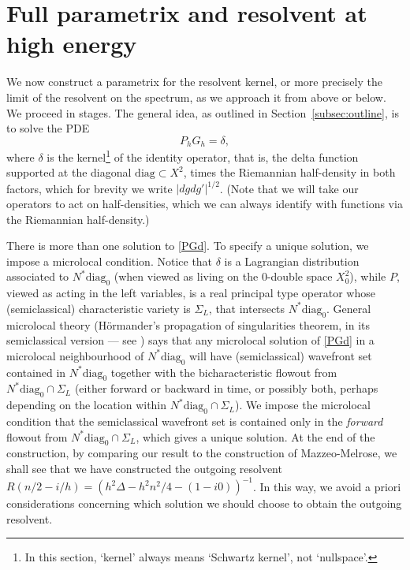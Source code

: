 \documentclass[10pt, a4paper, twoside]{amsart}
\numberwithin{equation}{section}
\theoremstyle{remark}
\begin{document}
\section{Full parametrix and resolvent at high energy}\label{sec:parametrix}
We now construct a parametrix for the resolvent kernel, or more precisely the limit of the resolvent on the spectrum, as we approach it from above or below. We proceed in stages. The general idea, as outlined in Section~\ref{subsec:outline}, is to solve the PDE
\begin{equation}
P_h G_h = \delta,
\label{PGd}\end{equation}
where $\delta$ is the kernel\footnote{In this section, `kernel' always means `Schwartz kernel', not `nullspace'.} of the identity operator, that is, the delta function supported at the diagonal ${\mathrm{diag}} \subset X^2$, times the Riemannian half-density in both factors, which for brevity we write  $|dg dg'|^{1/2}$. (Note that we will take our operators to act on half-densities, which we can always identify with functions via the Riemannian half-density.) 

There is more than one solution to \eqref{PGd}. To specify a unique solution, we impose a microlocal condition. Notice that $\delta$ is a Lagrangian distribution associated to $N^* {\mathrm{diag}_0}$ (when viewed as living on the $0$-double space $X^2_0$), while $P$, viewed as acting in the left variables, is a real principal type operator whose (semiclassical) characteristic variety is $\Sigma_L$, that intersects 
$N^* {\mathrm{diag}_0}$. General microlocal theory (H\"ormander's propagation of singularities theorem, in its semiclassical version --- see \cite[Section 12.3]{zworski})  says that any microlocal solution of \eqref{PGd} in a microlocal neighbourhood of $N^* {\mathrm{diag}_0}$ will have (semiclassical) wavefront set contained in $N^* {\mathrm{diag}_0}$ together with the bicharacteristic flowout from $N^* {\mathrm{diag}_0} \cap \Sigma_L$ (either forward or backward in time, or possibly both, perhaps depending on the location within $N^* {\mathrm{diag}_0} \cap \Sigma_L$). We impose the microlocal condition that the semiclassical wavefront set is contained only in the \emph{forward}  flowout from $N^* {\mathrm{diag}_0} \cap \Sigma_L$, which gives a unique solution. At the end of the construction, by comparing our result to the construction of Mazzeo-Melrose, we shall see that we have constructed the outgoing resolvent $R(n/2 - i/h) = (h^2 \Delta - h^2 n^2/4 - (1 - i0))^{-1}$. In this way, we avoid a priori considerations concerning which solution we should choose to obtain the outgoing resolvent. 
\end{document}
